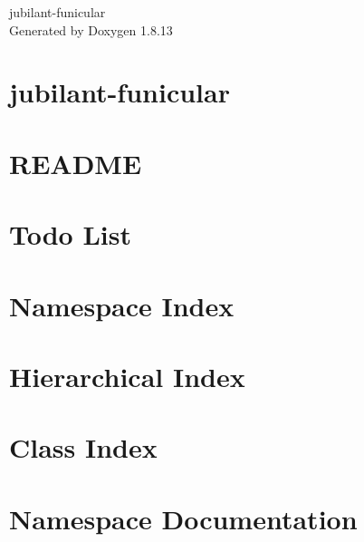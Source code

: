 \documentclass[twoside]{book}
\newcommand{\+}{\discretionary{\mbox{\scriptsize$\hookleftarrow$}}{}{}}
\newcommand{\clearemptydoublepage}{%
  \newpage{\pagestyle{empty}\cleardoublepage}%
}
\begin{document}
\hypersetup{pageanchor=false,
             bookmarksnumbered=true,
             pdfencoding=unicode
            }
\begin{titlepage}
\vspace*{7cm}
\begin{center}%
{\Large jubilant-\/funicular }\\
\vspace*{1cm}
{\large Generated by Doxygen 1.8.13}\\
\end{center}
\end{titlepage}
\clearemptydoublepage
{}
\tableofcontents
\clearemptydoublepage
{}
\hypersetup{pageanchor=true}

\chapter{jubilant-\/funicular}
\label{index}\hypertarget{index}{}
\chapter{R\+E\+A\+D\+ME}
\label{md_doxygen-theme_README}

\chapter{Todo List}
\label{todo}

\chapter{Namespace Index}

\chapter{Hierarchical Index}

\chapter{Class Index}

\chapter{Namespace Documentation}


\end{document}
